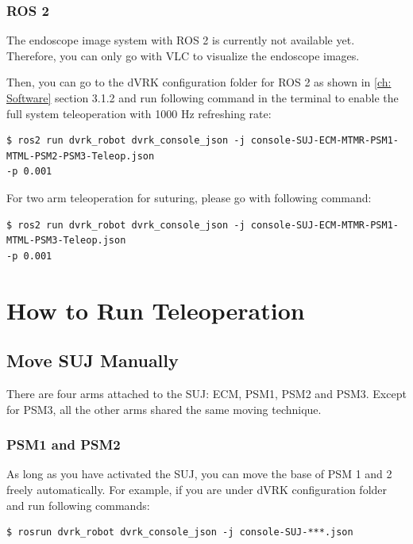 \subsection{ROS 2}

The endoscope image system with ROS 2 is currently not available yet. Therefore, you can only go with VLC to visualize the endoscope images.

Then, you can go to the dVRK configuration folder for ROS 2 as shown in \autoref{ch: Software} section 3.1.2 and run following command in the terminal to enable the full system teleoperation with 1000 Hz refreshing rate:

\begin{verbatim}
$ ros2 run dvrk_robot dvrk_console_json -j console-SUJ-ECM-MTMR-PSM1-MTML-PSM2-PSM3-Teleop.json
-p 0.001
\end{verbatim}

For two arm teleoperation for suturing, please go with following command:

\begin{verbatim}
$ ros2 run dvrk_robot dvrk_console_json -j console-SUJ-ECM-MTMR-PSM1-MTML-PSM3-Teleop.json
-p 0.001
\end{verbatim}

\chapter{How to Run Teleoperation}
\label{ch: Teleop}

\section{Move SUJ Manually}

There are four arms attached to the SUJ: ECM, PSM1, PSM2 and PSM3. Except for PSM3, all the other arms shared the same moving technique.

\subsection{PSM1 and PSM2}

As long as you have activated the SUJ, you can move the base of PSM 1 and 2 freely automatically. For example, if you are under dVRK configuration folder and run following commands: 

\begin{verbatim}
$ rosrun dvrk_robot dvrk_console_json -j console-SUJ-***.json
\end{verbatim}

